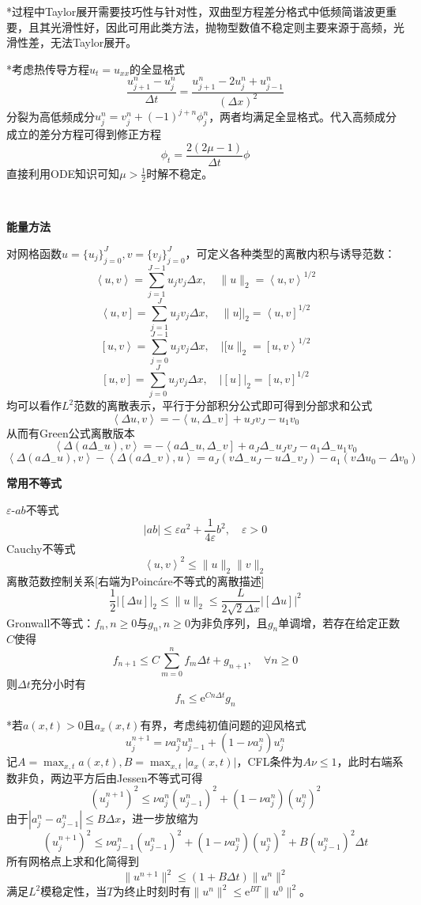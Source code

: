 \documentclass[a4paper,UTF8,fontset=windows]{ctexart}
\newcommand*{\nol}[2]{\left<#1,#2\right]}
\newcommand*{\noln}[1]{\|#1]|_2}
\newcommand*{\nor}[2]{\left[#1,#2\right>}
\newcommand*{\norn}[1]{|[#1\|_2}
\begin{document}
*过程中Taylor展开需要技巧性与针对性，双曲型方程差分格式中低频简谐波更重要，且其光滑性好，因此可用此类方法，抛物型数值不稳定则主要来源于高频，光滑性差，无法Taylor展开。

*考虑热传导方程$u_t=u_{xx}$的全显格式
$$\frac{u_{j+1}^n-u_j^n}{\Delta t}=\frac{u_{j+1}^n-2u_j^n+u_{j-1}^n}{(\Delta x)^2}$$
分裂为高低频成分$u_j^n=v_j^n+(-1)^{j+n}\phi_j^n$，两者均满足全显格式。代入高频成分成立的差分方程可得到修正方程
$$\phi_t=\frac{2(2\mu-1)}{\Delta t}\phi$$
直接利用ODE知识可知$\mu>\frac{1}{2}$时解不稳定。

\

\textbf{能量方法}

对网格函数$u=\{u_j\}_{j=0}^J,v=\{v_j\}_{j=0}^J$，可定义各种类型的离散内积与诱导范数：
$$\left<u,v\right>=\sum_{j=1}^{J-1}u_jv_j\Delta x,\quad\|u\|_2=\left<u,v\right>^{1/2}$$
$$\nol{u}{v}=\sum_{j=1}^Ju_jv_j\Delta x,\quad\noln{u}=\nol{u}{v}^{1/2}$$
$$\nor{u}{v}=\sum_{j=0}^{J-1}u_jv_j\Delta x,\quad\norn{u}=\nor{u}{v}^{1/2}$$
$$\left[u,v\right]=\sum_{j=0}^Ju_jv_j\Delta x,\quad|[u]|_2=\left[u,v\right]^{1/2}$$
均可以看作$L^2$范数的离散表示，平行于分部积分公式即可得到分部求和公式
$$\left<\Delta u,v\right>=-\nol{u}{\Delta_-v}+u_Jv_J-u_1v_0$$
从而有Green公式离散版本
$$\left<\Delta(a\Delta_-u),v\right>=-\nol{a\Delta_-u}{\Delta_-v}+a_J\Delta_-u_Jv_J-a_1\Delta_-u_1v_0$$
$$\left<\Delta(a\Delta_-u),v\right>-\left<\Delta(a\Delta_-v),u\right>=a_J(v\Delta_-u_J-u\Delta_-v_J)-a_1(v\Delta u_0-\Delta v_0)$$

\textbf{常用不等式}

$\varepsilon$-$ab$不等式
$$|ab|\le\varepsilon a^2+\frac{1}{4\varepsilon}b^2,\quad\varepsilon>0$$
Cauchy不等式
$$\left<u,v\right>^2\le\|u\|_2\|v\|_2$$
离散范数控制关系[右端为Poinc\'are不等式的离散描述]
$$\frac{1}{2}|[\Delta u]|_2\le\|u\|_2\le\frac{L}{2\sqrt2\Delta x}|[\Delta u]|^2$$
Gronwall不等式：$f_n,n\ge0$与$g_n,n\ge0$为非负序列，且$g_n$单调增，若存在给定正数$C$使得
$$f_{n+1}\le C\sum_{m=0}^nf_m\Delta t+g_{n+1},\quad\forall n\ge0$$
则$\Delta t$充分小时有
$$f_n\le\mathrm{e}^{Cn\Delta t}g_n$$

*若$a(x,t)>0$且$a_x(x,t)$有界，考虑纯初值问题的迎风格式
$$u_j^{n+1}=\nu a_j^nu_{j-1}^n+(1-\nu a_j^n)u_j^n$$
记$A=\max_{x,t}a(x,t),B=\max_{x,t}|a_x(x,t)|$，CFL条件为$A\nu\le1$，此时右端系数非负，两边平方后由Jessen不等式可得
$$(u_j^{n+1})^2\le\nu a_j^n(u_{j-1}^n)^2+(1-\nu a_j^n)(u_j^n)^2$$
由于$|a_j^n-a_{j-1}^n|\le B\Delta x$，进一步放缩为
$$(u_j^{n+1})^2\le\nu a_{j-1}^n(u_{j-1}^n)^2+(1-\nu a_j^n)(u_j^n)^2+B(u_{j-1}^n)^2\Delta t$$
所有网格点上求和化简得到
$$\|u^{n+1}\|^2\le(1+B\Delta t)\|u^n\|^2$$
满足$L^2$模稳定性，当$T$为终止时刻时有$\|u^n\|^2\le\mathrm{e}^{BT}\|u^0\|^2$。
\end{document}
